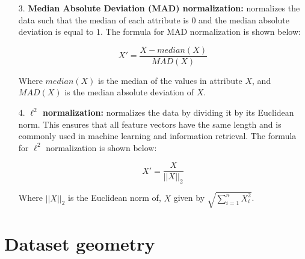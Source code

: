 \begin{enumerate}

        \item[3.] \textbf{Median Absolute Deviation (MAD) normalization:} normalizes the data such that the median of each attribute is $0$ and the median absolute deviation is equal to $1$. The formula for MAD normalization is shown below:

        \begin{equation}
        X'=\frac{X-median(X)}{MAD(X)}
        \end{equation}

        Where $median(X)$ is the median of the values in attribute $X$, and $MAD(X)$ is the median absolute deviation of $X$.
        
        \item[4.] \textbf{$\ell^2$ normalization:} normalizes the data by dividing it by its Euclidean norm. This ensures that all feature vectors have the same length and is commonly used in machine learning and information retrieval. The formula for $\ell^2$ normalization is shown below:

        \begin{equation}
        X'=\frac{X}{||X||_2}
        \end{equation}

        Where $||X||_2$ is the Euclidean norm of, $X$ given by $\sqrt{\sum_{i=1}^n X_i^2}$.
\end{enumerate}


\section{Dataset geometry} \label{sec:flat}


